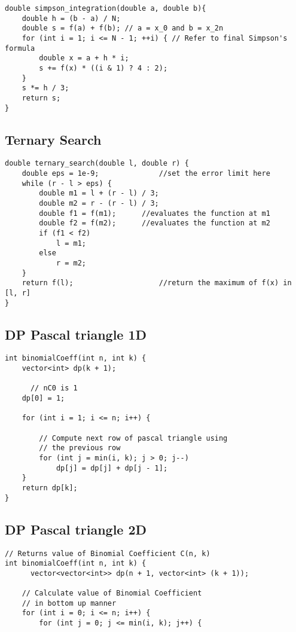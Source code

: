 \documentclass[10pt]{article}
\begin{document}
\begin{multicols*}{2}
\begin{lstlisting}[style=compactcpp]
double simpson_integration(double a, double b){
    double h = (b - a) / N;
    double s = f(a) + f(b); // a = x_0 and b = x_2n
    for (int i = 1; i <= N - 1; ++i) { // Refer to final Simpson's formula
        double x = a + h * i;
        s += f(x) * ((i & 1) ? 4 : 2);
    }
    s *= h / 3;
    return s;
}
\end{lstlisting}
\subsection{Ternary Search}
\begin{lstlisting}[style=compactcpp]
double ternary_search(double l, double r) {
    double eps = 1e-9;              //set the error limit here
    while (r - l > eps) {
        double m1 = l + (r - l) / 3;
        double m2 = r - (r - l) / 3;
        double f1 = f(m1);      //evaluates the function at m1
        double f2 = f(m2);      //evaluates the function at m2
        if (f1 < f2)
            l = m1;
        else
            r = m2;
    }
    return f(l);                    //return the maximum of f(x) in [l, r]
}
\end{lstlisting}
\subsection{DP Pascal triangle 1D}
\begin{lstlisting}[style=compactcpp]
int binomialCoeff(int n, int k) {
    vector<int> dp(k + 1);

      // nC0 is 1
    dp[0] = 1; 

    for (int i = 1; i <= n; i++) {
      
        // Compute next row of pascal triangle using
        // the previous row
        for (int j = min(i, k); j > 0; j--)
            dp[j] = dp[j] + dp[j - 1];
    }
    return dp[k];
}
\end{lstlisting}
\subsection{DP Pascal triangle 2D}
\begin{lstlisting}[style=compactcpp]
    // Returns value of Binomial Coefficient C(n, k)
int binomialCoeff(int n, int k) {
      vector<vector<int>> dp(n + 1, vector<int> (k + 1));
  
    // Calculate value of Binomial Coefficient
    // in bottom up manner
    for (int i = 0; i <= n; i++) {
        for (int j = 0; j <= min(i, k); j++) {
          

\end{lstlisting}
\end{multicols*}
\end{document}

